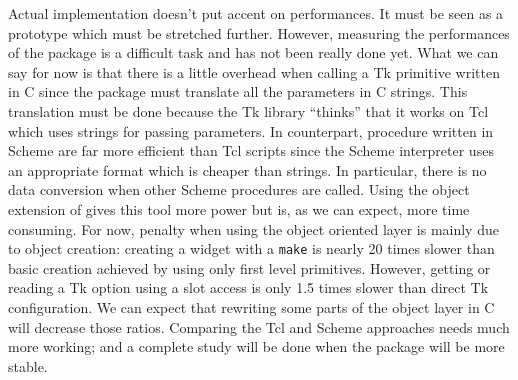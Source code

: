 Actual implementation doesn't put accent on performances. It must be seen as a
prototype which must be stretched further. However, measuring the performances
of the \stk package is a difficult task and has not been really done yet. What
we can say for now is that there is a little overhead when calling a Tk
primitive written in C since the \stk package must translate all the
parameters in C strings. This translation must be done because the Tk library
``thinks'' that it works on Tcl which uses strings for passing parameters. In
counterpart, procedure written in Scheme are far more efficient than Tcl
scripts since the Scheme interpreter uses an appropriate format which is
cheaper than strings. In particular, there is no data conversion when other
Scheme procedures are called. Using the object extension of
\stk gives this tool more power but is, as we can expect, more time consuming.
For now, penalty when using the \stk object oriented layer is mainly due to
object creation: creating a widget with a {\tt make} is nearly 20 times slower
than basic creation achieved by using only first level primitives. However,
getting or reading a Tk option using a slot access is only 1.5 times slower
than direct Tk configuration. We can expect that rewriting some parts of the
\stk object layer in C will decrease those ratios.
Comparing the Tcl and Scheme approaches needs much more working; and a
complete study will be done when the package will be more stable.


